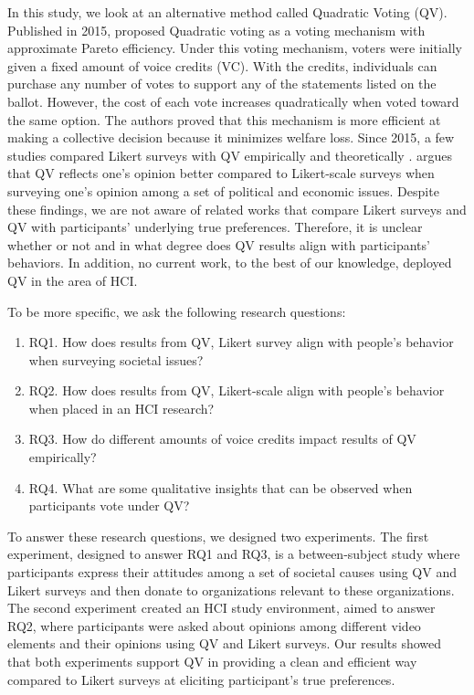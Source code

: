 In this study, 
we look at an alternative method
called Quadratic Voting (QV).
Published in 2015,
\textcite{posner2018radical}
proposed Quadratic voting
as a voting mechanism 
with approximate Pareto efficiency.
Under this voting mechanism,
voters were initially given 
a fixed amount of voice credits (VC).
With the credits, 
individuals can purchase 
any number of votes to support any of the statements
listed on the ballot.
However, the cost of each vote 
increases quadratically 
when voted toward the same option.
The authors proved that this 
mechanism is more efficient 
at making a collective decision 
because it minimizes welfare loss.
Since 2015, a few studies
compared Likert surveys with QV 
empirically and theoretically
\cite{quarfoot2017quadratic, naylor2017first}.
\textcite{cavaille2018towards} argues that 
QV reflects one's opinion better 
compared to Likert-scale surveys 
when surveying one's opinion
among a set of political and economic issues.
Despite these findings,
we are not aware of related works that
compare Likert surveys and QV
with participants' underlying true preferences.
Therefore, it is unclear whether or not
and in what degree
does QV results align with participants' behaviors.
In addition, 
no current work, to the best of our knowledge,
deployed QV in the area of HCI.

To be more specific, 
we ask the following research questions:
\begin{enumerate}[label={},leftmargin=\parindent]
    \item RQ1. How does results from 
               QV, Likert survey
               align with people's behavior 
               when surveying societal issues?
    \item RQ2. How does results from 
               QV, Likert-scale 
               align with people's behavior 
               when placed in an HCI research?
    \item RQ3. How do different amounts of
               voice credits impact results of QV empirically?
    \item RQ4. What are some qualitative insights that can be observed
               when participants vote under QV?
\end{enumerate}
To answer these research questions,
we designed two experiments.
The first experiment,
designed to answer RQ1 and RQ3,
is a between-subject study
where participants express their attitudes
among a set of societal causes using 
QV and Likert surveys
and then donate
to organizations relevant to these organizations.
The second experiment 
created an HCI study environment,
aimed to answer RQ2,
where participants were asked about 
opinions among different video elements
and their opinions using QV and Likert surveys.
Our results showed that both experiments support
QV in providing a clean and efficient way
compared to Likert surveys
at eliciting participant's true preferences.

